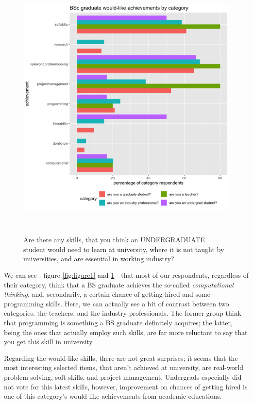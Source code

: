 \documentclass{sigchi}
\begin{document}
\begin{figure}
 \includegraphics[scale=0.2]{../data-analysis/plots_output/BSc_graduate_would-like_achievements_by_category.png}
  \caption{Are there any skills, that you think an UNDERGRADUATE student would need to learn at university, where it is not taught by universities, and are essential in working industry?}~\label{fig:figure2}
\end{figure}

We can see - figure \ref{fig:figure1} and \ref{fig:figure2} - that most of our respondents, regardless of their category, think that a BS graduate achieves the so-called \textit{computational thinking}, and, secondarily, a certain chance of getting hired and some programming skills. Here, we can actually see a bit of contrast between two categories: the teachers, and the industry professionals. The former group think that programming is something a BS graduate definitely acquires; the latter, being the ones that actually employ such skills, are far more reluctant to say that you get this skill in university.

Regarding the would-like skills, there are not great surprises; it seems that the most interesting selected items, that aren't achieved at university, are real-world problem solving, soft skills, and project management. Undergrads especially did not vote for this latest skills, however, improvement on chances of getting hired is one of this category's would-like achievements from academic educations.
\end{document}
